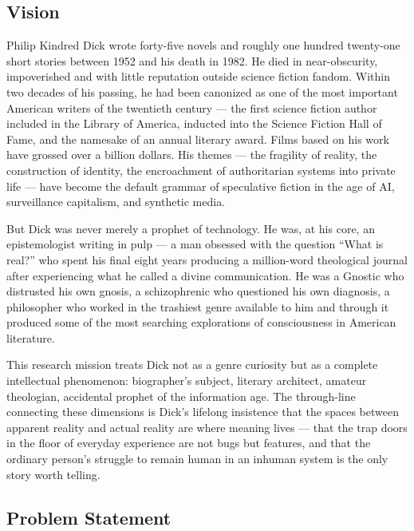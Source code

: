 \documentclass[11pt,letterpaper]{article}
\begin{document}
\subsection{Vision}

Philip Kindred Dick wrote forty-five novels and roughly one hundred twenty-one short stories between 1952 and his death in 1982. He died in near-obscurity, impoverished and with little reputation outside science fiction fandom. Within two decades of his passing, he had been canonized as one of the most important American writers of the twentieth century --- the first science fiction author included in the Library of America, inducted into the Science Fiction Hall of Fame, and the namesake of an annual literary award. Films based on his work have grossed over a billion dollars. His themes --- the fragility of reality, the construction of identity, the encroachment of authoritarian systems into private life --- have become the default grammar of speculative fiction in the age of AI, surveillance capitalism, and synthetic media.

But Dick was never merely a prophet of technology. He was, at his core, an epistemologist writing in pulp --- a man obsessed with the question ``What is real?'' who spent his final eight years producing a million-word theological journal after experiencing what he called a divine communication. He was a Gnostic who distrusted his own gnosis, a schizophrenic who questioned his own diagnosis, a philosopher who worked in the trashiest genre available to him and through it produced some of the most searching explorations of consciousness in American literature.

This research mission treats Dick not as a genre curiosity but as a complete intellectual phenomenon: biographer's subject, literary architect, amateur theologian, accidental prophet of the information age. The through-line connecting these dimensions is Dick's lifelong insistence that the spaces between apparent reality and actual reality are where meaning lives --- that the trap doors in the floor of everyday experience are not bugs but features, and that the ordinary person's struggle to remain human in an inhuman system is the only story worth telling.

\subsection{Problem Statement}
\end{document}
